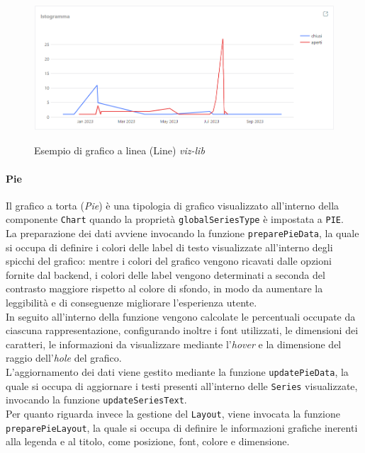 \begin{figure}[H]
    \centering
    \includegraphics[alt={Esempio di grafico a linea viz-lib}, width=0.8 \columnwidth, height=\maxdimen, keepaspectratio]{img/ex_line.png}
    \caption{Esempio di grafico a linea (Line) \textit{viz-lib}}
    \label{fig:line-example}
\end{figure}

\paragraph{Pie}
Il grafico a torta (\textit{Pie}) è una tipologia di grafico visualizzato all'interno della componente \texttt{Chart} quando la proprietà \texttt{globalSeriesType} è impostata a \texttt{PIE}. \\
La preparazione dei dati avviene invocando la funzione \texttt{preparePieData}, la quale si occupa di definire i colori delle label di testo visualizzate all'interno degli spicchi del grafico: mentre
i colori del grafico vengono ricavati dalle opzioni fornite dal backend, i colori delle label vengono determinati a seconda del contrasto maggiore rispetto al colore di sfondo, in modo da aumentare
la leggibilità e di conseguenze migliorare l'esperienza utente. \\
In seguito all'interno della funzione vengono calcolate le percentuali occupate da ciascuna rappresentazione, configurando inoltre i font utilizzati, le dimensioni dei caratteri, le informazioni da visualizzare
mediante l'\textit{hover} e la dimensione del raggio dell'\textit{hole} del grafico. \\
L'aggiornamento dei dati viene gestito mediante la funzione \texttt{updatePieData}, la quale si occupa di aggiornare i testi presenti all'interno delle \texttt{Series} visualizzate, invocando la funzione
\texttt{updateSeriesText}. \\
Per quanto riguarda invece la gestione del \texttt{Layout}, viene invocata la funzione \texttt{preparePieLayout}, la quale si occupa di definire le informazioni grafiche inerenti alla legenda e al titolo,
come posizione, font, colore e dimensione.

